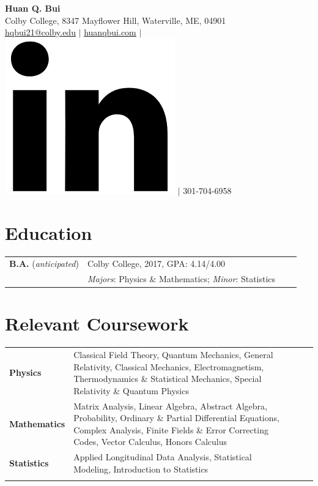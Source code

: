 \documentclass[a4paper, 9pt]{article}
\begin{document}
	\begin{center}
		{\Large\textbf{Huan Q. Bui}}\\
		\smallskip
		Colby College, 8347 Mayflower Hill, Waterville, ME, 04901\\ \href{mailto:hqbui21@colby.edu}{\underline{hqbui21@colby.edu}} $\vert$ \href{https://huanqbui.com}{\underline{huanqbui.com}} $\vert$ \href{https://www.linkedin.com/in/huan-bui/}{\includegraphics[scale=0.04]{linkedin_logo.PNG}} $\vert$ 301-704-6958
	\end{center}
	\section*{\normalsize{{\color{colby}Education}}}
		\begin{tabular}{lp{14cm}lp{8in}}
			\textbf{B.A.} (\textit{anticipated}) & {Colby College}, 2017\textemdash 2021, GPA: 4.14/4.00\\ & \textit{Majors}: Physics \& Mathematics; \textit{Minor}: Statistics\\
		\end{tabular}
	\section*{\normalsize{{\color{colby}Relevant Coursework}}}
	\begin{tabular}{lp{15.5cm}lp{2in}}
		\textbf{Physics} 
		& Classical Field Theory, Quantum Mechanics, General Relativity, Classical Mechanics, Electromagnetism, Thermodynamics \& Statistical Mechanics, Special Relativity \& Quantum Physics\\
		
		\textbf{Mathematics} 
		&  Matrix Analysis, Linear Algebra, Abstract Algebra, Probability, Ordinary \& Partial Differential Equations, Complex Analysis, Finite Fields \& Error Correcting Codes, Vector Calculus, Honors Calculus\\
		
		\textbf{Statistics}
		& Applied Longitudinal Data Analysis, Statistical Modeling, Introduction to Statistics\\\\ 
	\end{tabular}
\end{document}
